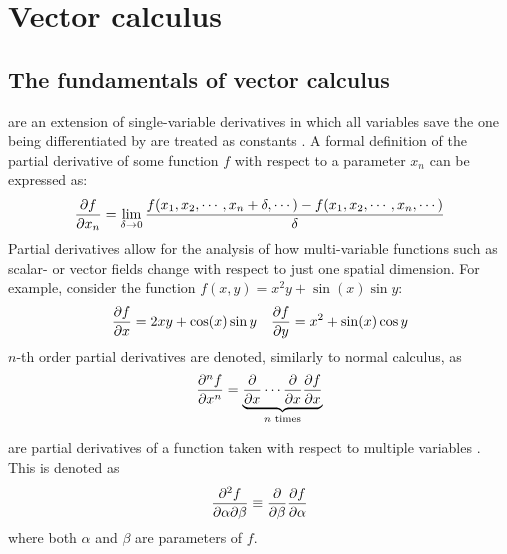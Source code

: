 \section{Vector calculus}
\subsection{The fundamentals of vector calculus}

\begin{defn}
	 are an extension of single-variable derivatives in which all variables save
	the one being differentiated by are treated as constants \cite{MORTIMER201389}. A formal definition of the
	partial derivative of some function $f$ with respect to a parameter $x_n$ can be expressed as:
	\begin{equation}
		\pdv{f}{x_n}=\lim_{\delta\rightarrow0}\frac{f(x_1,x_2,\cdots,x_n+\delta,\cdots)-f(x_1,x_2,\cdots,x_n,\cdots)}{\delta}
	\end{equation}
	Partial derivatives allow for the analysis of how multi-variable functions such as scalar- or vector fields change
	with respect to just one spatial dimension. For example, consider the function $f(x,y)=x^2y+\sin(x)\sin y$:
	\begin{align*}
		\pdv{f}{x}=2xy+\cos(x)\sin y&&\pdv{f}{y}=x^2+\sin(x)\cos y
	\end{align*}
	$n$-th order partial derivatives are denoted, similarly to normal calculus, as
	$$
	\pdv[n]{f}{x}=\underbrace{\pdv{x}\cdots\pdv{x}\pdv{f}{x}}_{n\text{ times}}
	$$
\end{defn}
\begin{defn}
	 are partial derivatives of a function taken with respect to multiple
	variables \cite{GARRETT2015377}. This is denoted as
	$$
	\pdv{f}{\alpha}{\beta}\equiv\pdv{\beta}\pdv{f}{\alpha}
	$$
	where both $\alpha$ and $\beta$ are parameters of $f$.
\end{defn}

